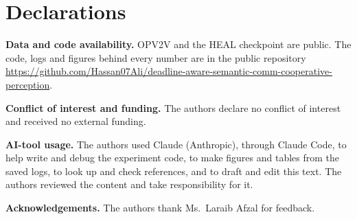 \documentclass[conference]{IEEEtran}
\begin{document}
\section*{Declarations}
\textbf{Data and code availability.} OPV2V \cite{xu2022opv2v} and the HEAL checkpoint \cite{lu2024heal} are public. The code, logs and figures behind every number are in the public repository \url{https://github.com/Hassan07Ali/deadline-aware-semantic-comm-cooperative-perception}.

\textbf{Conflict of interest and funding.} The authors declare no conflict of interest and received no external funding.

\textbf{AI-tool usage.} The authors used Claude (Anthropic), through Claude Code, to help write and debug the experiment code, to make figures and tables from the saved logs, to look up and check references, and to draft and edit this text. The authors reviewed the content and take responsibility for it.

\textbf{Acknowledgements.} The authors thank Ms.\ Laraib Afzal for feedback.

\balance
\footnotesize


\end{document}
